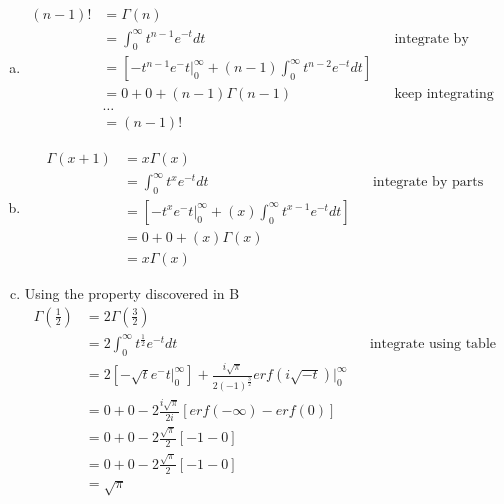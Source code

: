 \documentclass[12pt]{article}
\newenvironment{problem}[2][Problem]{\begin{trivlist}
\item[\hskip \labelsep {\bfseries #1}\hskip \labelsep {\bfseries #2.}]
  \vspace{1 cm}
}{\end{trivlist}}
\begin{document}
\begin{problem}{3.33}
\item
  \begin{enumerate}[a.]
    \item %
      \begin{align*}
        (n-1)! &= \Gamma(n) \\
        &= \int_0^\infty t^{n-1}e^{-t}dt & & \textrm{integrate by parts} \\
        &= \left[ -t^{n-1}e^-t\big|_0^\infty 
          + (n-1)\int_0^\infty t^{n-2}e^{-t}dt\right] \\
        &= 0+0+(n-1)\Gamma(n-1) & & \textrm{keep integrating by parts until} \\
        &\dots \\ 
        &= (n-1)!
      \end{align*}
    \item %
       \begin{align*}
        \Gamma(x+1) &= x\Gamma(x) \\
        &= \int_0^\infty t^{x}e^{-t}dt & & \textrm{integrate by parts} \\
        &= \left[ -t^{x}e^-t\big|_0^\infty 
          + (x)\int_0^\infty t^{x-1}e^{-t}dt\right] \\
        &= 0+0+(x)\Gamma(x) \\
        &= x\Gamma(x) 
      \end{align*}
    \item %
      Using the property discovered in B \\
       \begin{align*}
         \Gamma\left(\frac{1}{2}\right) &= 2\Gamma\left(\frac{3}{2}\right) \\
         &= 2\int_0^\infty t^{\frac{1}{2}}e^{-t}dt & & \textrm{integrate using table} \\
         &= 2\left[ -\sqrt{t}e^-t\big|_0^\infty \right]
           + \frac{i\sqrt{\pi}}{2(-1)^{\frac{3}{2}}}erf(i\sqrt{-t})\big|_0^\infty \\
           &= 0+0-2\frac{i\sqrt{\pi}}{2i}\left[erf(-\infty) - erf(0)\right]  \\
           &= 0+0-2\frac{\sqrt{\pi}}{2}\left[-1 - 0\right]  \\
           &= 0+0-2\frac{\sqrt{\pi}}{2}\left[-1 - 0\right]  \\
           &= \sqrt{\pi}
      \end{align*} 
    \end{enumerate}
\end{problem}
\end{document}
